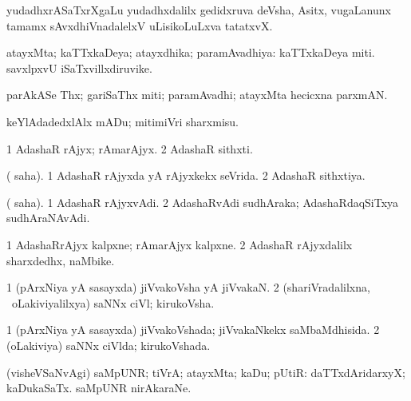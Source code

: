 {{{\bentry 
{}
\gl{\nA}
\expl{\Latin }
\bmng
yudadhxrASaTxrXgaLu yudadhxdalilx gedidxruva deVsha, Asitx, \mo vugaLanunx tamamx sAvxdhiVnadalelxV uLisikoLuLxva tatatxvX. 
\emng
\eentry

\bentry
{} 
\gl{\gu}
\expl{}
\bmng
atayxMta; kaTTxkaDeya; atayxdhika; paramAvadhiya:  kaTTxkaDeya miti.  savxlpxvU iSaTxvillxdiruvike. 
\emng
\eentry

\bentry
{} 
\gl{\nA}
\expl{}
\bmng
parAkASe Thx; gariSaThx miti; paramAvadhi; atayxMta hecicxna parxmAN. 
\emng

\noindent 
\gl{\pagu}
\expl{}
\bmng
{} keYlAdadedxlAlx mADu; mitimiVri sharxmisu. 
\emng
\eentry

\bentry
{} 
\gl{\nA}
\bmng
\bnum
\num{1} AdashaR rAjyx; rAmarAjyx. 
\num{2} AdashaR sithxti. 
\enum
\emng
\eentry

\bentry
{} 
\gl{\gu}
\expl{}
\bmng
( saha). 
\bnum
\num{1} AdashaR rAjyxda yA rAjyxkekx seVrida. 
\num{2} AdashaR sithxtiya. 
\enum
\emng
\eentry

\bentry
{} 
\gl{\nA}
\expl{}
\bmng
( saha).
\bnum
\num{1} AdashaR rAjyxvAdi. 
\num{2} AdashaRvAdi sudhAraka; AdashaRdaqSiTxya sudhAraNAvAdi. 
\enum
\emng
\eentry

\bentry
{} 
\gl{\nA}
\expl{}
\bmng
\bnum
\num{1} AdashaRrAjyx kalpxne; rAmarAjyx kalpxne. 
\num{2} AdashaR rAjyxdalilx sharxdedhx, naMbike. 
\enum
\emng
\eentry

\bentry 
{} 
\gl{\nA}
\bmng
\bnum
\num{1} (pArxNiya yA sasayxda) jiVvakoVsha yA jiVvakaN. 
\num{2} (shariVradalilxna, \kanmu\ oLakiviyalilxya) saNNx ciVl; kirukoVsha. 
\enum
\emng
\eentry

\bentry
{} 
\gl{\gu}
\expl{}
\bmng
\bnum
\num{1} (pArxNiya yA sasayxda) jiVvakoVshada; jiVvakaNkekx saMbaMdhisida. 
\num{2} (oLakiviya) saNNx ciVlda; kirukoVshada. 
\enum
\emng
\eentry

\bentry
{} 
\gl{\gu}
\expl{}
\bmng
(visheVSaNvAgi) saMpUNR; tiVrA; atayxMta; kaDu; pUtiR:  daTTxdAridarxyX; kaDukaSaTx.  saMpUNR nirAkaraNe. 
\emng
\eentry

}}}
